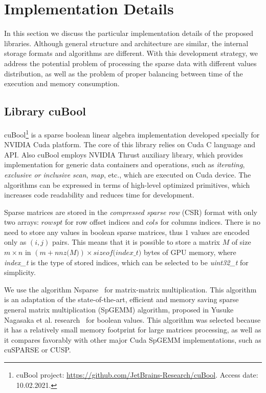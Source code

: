 \section{Implementation Details}

In this section we discuss the particular implementation details of the proposed libraries.
Although general structure and architecture are similar, the internal storage formats and algorithms are different.
With this development strategy, we address the potential problem of processing the sparse data with different values distribution, as well as the problem of proper balancing between time of the execution and memory consumption.

\subsection{Library cuBool}

cuBool\footnote{cuBool project: \url{https://github.com/JetBrains-Research/cuBool}. Access date: 10.02.2021.}
is a sparse boolean linear algebra implementation developed specially for NVIDIA Cuda platform.
The core of this library relies on Cuda C language and API.
Also cuBool employs NVIDIA Thrust auxiliary library, which provides implementation for generic data containers and operations, such as \textit{iterating}, \textit{exclusive or inclusive scan}, \textit{map}, etc., which are executed on Cuda device.
The algorithms can be expressed in terms of high-level optimized primitives, which increases code readability and reduces time for development.

Sparse matrices are stored in the \textit{compressed sparse row} (CSR) format with only two arrays: $rowspt$ for row offset indices and $cols$ for columns indices.
There is no need to store any values in boolean sparse matrices, thus $1$ values are encoded only as $(i, j)$ pairs.
This means that it is possible to store a matrix $M$ of size $m \times n$ in $(m + \textit{nnz(M)}) \times \textit{sizeof(index\_t)}$ bytes of GPU memory, where \textit{index\_t} is the type of stored indices, which can be selected to be \textit{uint32\_t} for simplicity.

We use the algorithm Nsparse~\cite{inproceedings:cfpq_for_redis_graph} for matrix-matrix multiplication.
This algorithm is an adaptation of the state-of-the-art, efficient and memory saving sparse general matrix multiplication (SpGEMM) algorithm, proposed in Yusuke Nagasaka et al. research~\cite{algo:spgemm:8025284} for boolean values.
This algorithm was selected because it has a relatively small memory footprint for large matrices processing, as well as it compares favorably with other major Cuda SpGEMM implementations, such as cuSPARSE or CUSP.

